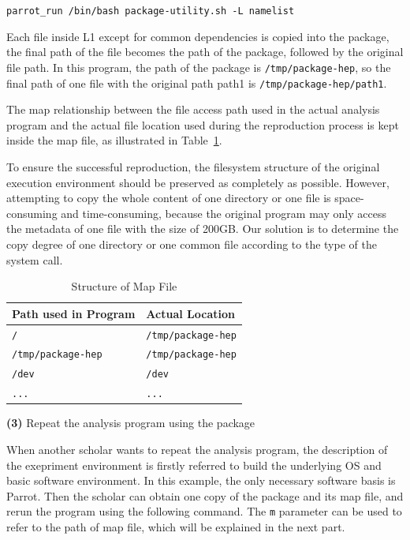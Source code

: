 \documentclass{sig-alternate}
\begin{document}
{\tt parrot\_run /bin/bash package-utility.sh -L namelist}

Each file inside L1 except for common dependencies is copied into the package, the final path of the file
becomes the path of the package, followed by the original file path. In this
program, the path of the package is {\tt /tmp/package-hep}, so the final path of one
file with the original path path1 is {\tt /tmp/package-hep/path1}.

The map relationship between the file access path used in the actual analysis
program and the actual file location used during the reproduction process is
kept inside the map file, as illustrated in Table~\ref{table:map-file}.

To ensure the successful reproduction, the filesystem structure of the original
execution environment should be preserved as completely as possible. However,
attempting to copy the whole content of one directory or one file is
space-consuming and time-consuming, because the original program may only
access the metadata of one file with the size of 200GB. Our solution is to
determine the copy degree of one directory or one common file according to the
type of the system call.


\begin{table}
    \centering
    \begin{tabular}{|l|l|}
    \hline
    \bf Path used in Program & \bf Actual Location \\ \hline
    {\tt /} & {\tt /tmp/package-hep} \\ \hline
    {\tt /tmp/package-hep} & {\tt /tmp/package-hep} \\ \hline
    {\tt /dev} & {\tt /dev} \\ \hline
    {\tt ...} & {\tt ...}\\ \hline
    \end{tabular}
    \caption{Structure of Map File}
    \label{table:map-file}
\end{table}

{\bf (3)} Repeat the analysis program using the package

When another scholar wants to repeat the analysis program, 
the description of the exepriment environment is firstly referred to build the underlying OS and basic software environment. In this example, the only necessary software basis is Parrot. Then the scholar can obtain one copy of the package and its map file, and rerun the program using the following command. The {\tt m} parameter can be used to refer to the path of map file, which will be explained in the next part.
\end{document}
